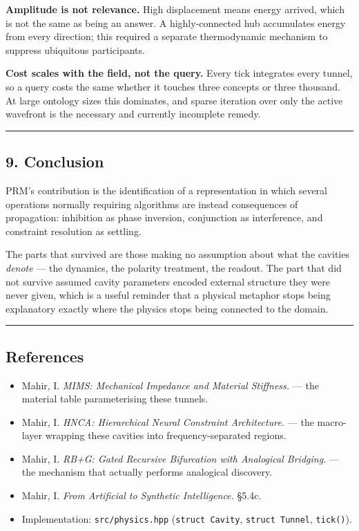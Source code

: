 \documentclass[
  11pt,
  a4paper,
]{article}
\providecommand{\tightlist}{%
  \setlength{\itemsep}{0pt}\setlength{\parskip}{0pt}}
\begin{document}
\textbf{Amplitude is not relevance.} High displacement means energy
arrived, which is not the same as being an answer. A highly-connected
hub accumulates energy from every direction; this required a separate
thermodynamic mechanism to suppress ubiquitous participants.

\textbf{Cost scales with the field, not the query.} Every tick
integrates every tunnel, so a query costs the same whether it touches
three concepts or three thousand. At large ontology sizes this
dominates, and sparse iteration over only the active wavefront is the
necessary and currently incomplete remedy.

\begin{center}\rule{0.5\linewidth}{0.5pt}\end{center}

\subsection{9. Conclusion}\label{conclusion}

PRM's contribution is the identification of a representation in which
several operations normally requiring algorithms are instead
consequences of propagation: inhibition as phase inversion, conjunction
as interference, and constraint resolution as settling.

The parts that survived are those making no assumption about what the
cavities \emph{denote} --- the dynamics, the polarity treatment, the
readout. The part that did not survive assumed cavity parameters encoded
external structure they were never given, which is a useful reminder
that a physical metaphor stops being explanatory exactly where the
physics stops being connected to the domain.

\begin{center}\rule{0.5\linewidth}{0.5pt}\end{center}

\subsection{References}\label{references}

\begin{itemize}
\tightlist
\item
  Mahir, I. \emph{MIMS: Mechanical Impedance and Material Stiffness.}
  --- the material table parameterising these tunnels.
\item
  Mahir, I. \emph{HNCA: Hierarchical Neural Constraint Architecture.}
  --- the macro-layer wrapping these cavities into frequency-separated
  regions.
\item
  Mahir, I. \emph{RB+G: Gated Recursive Bifurcation with Analogical
  Bridging.} --- the mechanism that actually performs analogical
  discovery.
\item
  Mahir, I. \emph{From Artificial to Synthetic Intelligence.} §5.4c.
\item
  Implementation: \texttt{src/physics.hpp} (\texttt{struct\ Cavity},
  \texttt{struct\ Tunnel}, \texttt{tick()}).
\end{itemize}
\end{document}
